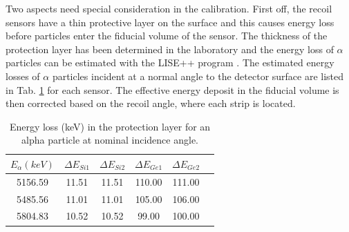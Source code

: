 \documentclass[number,5p]{elsarticle}
\begin{document}
Two aspects need special consideration in the calibration.
First off, the recoil sensors have a thin protective layer on the surface and this
causes energy loss before particles enter the fiducial volume of the sensor.
The thickness of the protection layer has been determined in the laboratory
\cite{recoil_article} and the energy loss of $\alpha$ particles can be estimated
with the LISE++ program \cite{LISE}.
The estimated energy losses of $\alpha$ particles incident at a normal angle to
the detector surface are listed in Tab. \ref{tab:dead_layer} for each sensor.
The effective energy deposit in the fiducial volume is then corrected based on the recoil angle, where each strip is located.
\begin{table}[h!]
  \centering
  \caption{Energy loss (\si{\keV}) in the protection layer for an alpha particle
    at nominal incidence angle.}
  \label{tab:dead_layer}
  \begin{tabular}{cccccc}
    \hline
    \(E_{\alpha} (keV)\) & \(\Delta E_{Si1}\) & \(\Delta E_{Si2}\) & \(\Delta E_{Ge1}\) & \(\Delta E_{Ge2}\) \\
    \hline
    5156.59 & 11.51 & 11.51 & 110.00 & 111.00 \\
    5485.56 & 11.01 & 11.01 & 105.00 & 106.00 \\
    5804.83 & 10.52 & 10.52 & 99.00  & 100.00 \\
    \hline
  \end{tabular}
\end{table}
\end{document}
